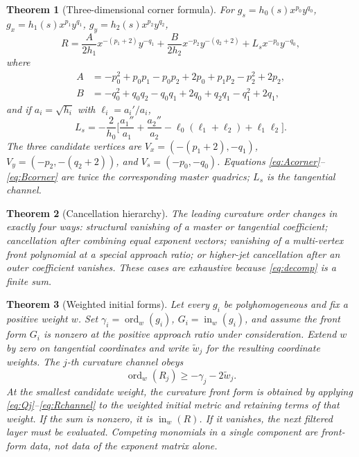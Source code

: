 \documentclass[11pt,a4paper]{article}
\newtheorem{theorem}{Theorem}[section]
\theoremstyle{definition}
\theoremstyle{remark}
\newcommand{\ord}{\operatorname{ord}}
\begin{document}
\begin{theorem}[Three-dimensional corner formula]
\label{thm:corner3d}
For \(g_s=h_0(s)x^{p_0}y^{q_0}\), \(g_x=h_1(s)x^{p_1}y^{q_1}\),
\(g_y=h_2(s)x^{p_2}y^{q_2}\),
\begin{equation}
R
=
\frac{A}{2h_1}x^{-(p_1+2)}y^{-q_1}
+\frac{B}{2h_2}x^{-p_2}y^{-(q_2+2)}
+L_sx^{-p_0}y^{-q_0},
\label{eq:corner3d}
\end{equation}
where
\begin{align}
A
&=
-p_0^2+p_0p_1-p_0p_2+2p_0+p_1p_2-p_2^2+2p_2,
\label{eq:Acorner}\\
B
&=
-q_0^2+q_0q_2-q_0q_1+2q_0+q_2q_1-q_1^2+2q_1,
\label{eq:Bcorner}
\end{align}
and if \(a_i=\sqrt{h_i}\) with \(\ell_i=a_i'/a_i\),
\begin{equation}
L_s
=
-\frac{2}{h_0}
\Biggl[
\frac{a_1''}{a_1}+\frac{a_2''}{a_2}
-\ell_0(\ell_1+\ell_2)+\ell_1\ell_2
\Biggr].
\label{eq:Ls}
\end{equation}
The three candidate vertices are
\(V_x=(-(p_1+2),-q_1)\), \(V_y=(-p_2,-(q_2+2))\), and
\(V_s=(-p_0,-q_0)\). Equations \eqref{eq:Acorner}--\eqref{eq:Bcorner} are
twice the corresponding master quadrics; \(L_s\) is the tangential channel.
\end{theorem}

\begin{theorem}[Cancellation hierarchy]
\label{thm:cancelhier}
The leading curvature order changes in exactly four ways: structural vanishing
of a master or tangential coefficient; cancellation after combining equal
exponent vectors; vanishing of a multi-vertex front polynomial at a special
approach ratio; or higher-jet cancellation after an outer coefficient vanishes.
These cases are exhaustive because \eqref{eq:decomp} is a finite sum.
\end{theorem}

\begin{theorem}[Weighted initial forms]
\label{thm:initialform}
Let every \(g_i\) be polyhomogeneous and fix a positive weight \(w\). Set
\(\gamma_i=\ord_w(g_i)\), \(G_i=\operatorname{in}_w(g_i)\), and assume the front
form \(G_i\) is nonzero at the positive approach ratio under consideration.
Extend \(w\) by zero on tangential coordinates and write \(\widetilde w_j\) for
the resulting coordinate weights. The \(j\)-th curvature channel obeys
\begin{equation}
\ord_w(R_j)\ge-\gamma_j-2\widetilde w_j.
\label{eq:ordRj}
\end{equation}
At the smallest candidate weight, the curvature front form is obtained by
applying \eqref{eq:Qj}--\eqref{eq:Rchannel} to the weighted initial metric and
retaining terms of that weight. If the sum is nonzero, it is
\(\operatorname{in}_w(R)\). If it vanishes, the next filtered layer must be
evaluated. Competing monomials in a single component are front-form data, not
data of the exponent matrix alone.
\end{theorem}
\end{document}
